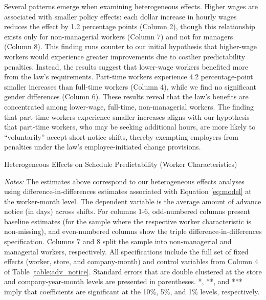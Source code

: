 \documentclass[letterpaper,11pt,leqno]{article}
\theoremstyle{paper}
\newcommand{\note}[2][]{\parbox{\textwidth}{\footnotesize\vspace*{10pt}\textit{#1}#2}}
\begin{document}
Several patterns emerge when examining heterogeneous effects. Higher wages are associated with smaller policy effects: each dollar increase in hourly wages reduces the effect by 1.2 percentage points (Column 2), though this relationship exists only for non-managerial workers (Column 7) and not for managers (Column 8). This finding runs counter to our initial hypothesis that higher-wage workers would experience greater improvements due to costlier predictability penalties. Instead, the results suggest that lower-wage workers benefited more from the law's requirements. Part-time workers experience 4.2 percentage-point smaller increases than full-time workers (Column 4), while we find no significant gender differences (Column 6). These results reveal that the law's benefits are concentrated among lower-wage, full-time, non-managerial workers. The finding that part-time workers experience smaller increases aligns with our hypothesis that part-time workers, who may be seeking additional hours, are more likely to “voluntarily” accept short-notice shifts, thereby exempting employers from penalties under the law's employee-initiated change provisions.


\begin{singlespace}
\begin{table}[h]
\caption{Heterogeneous Effects on Schedule Predictability (Worker Characteristics)}

\note{\scriptsize \textit{Notes: } The estimates above correspond to our heterogeneous effects analyses using difference-in-differences estimates associated with Equation \ref{eq:model} at the worker-month level. The dependent variable is the average amount of advance notice (in days) across shifts. For columns 1-6, odd-numbered columns present baseline estimates (for the sample where the respective worker characteristic is non-missing), and even-numbered columns show the triple difference-in-differences specification. Columns 7 and 8 split the sample into non-managerial and managerial workers, respectively. All specifications include the full set of fixed effects (worker, store, and company-month) and control variables from Column 4 of Table \ref{table:adv_notice}. Standard errors that are double clustered at the store and company-year-month levels are presented in parentheses. *, **, and *** imply that coefficients are significant at the 10\%, 5\%, and 1\% levels, respectively.}
\label{table:adv_notice_het_effects}
\end{table}
\end{singlespace}
\end{document}
